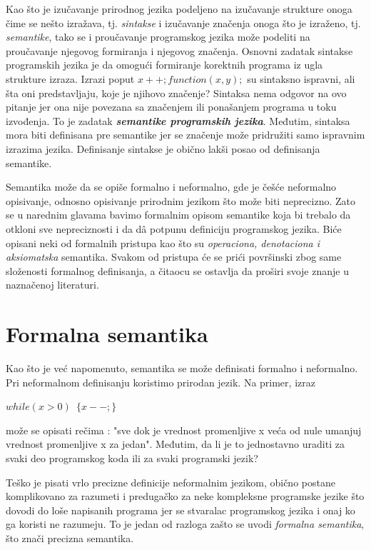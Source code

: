 \documentclass[a4paper]{article}
\begin{document}
{ Kao što je izučavanje prirodnog jezika podeljeno  na izučavanje strukture onoga čime se nešto izražava, tj. \textit{sintakse} i izučavanje značenja onoga što je izraženo, tj. \textit{semantike}, tako se i proučavanje programskog jezika može podeliti na proučavanje njegovog formiranja i njegovog značenja. Osnovni zadatak sintakse programskih jezika je da omogući formiranje korektnih programa iz ugla strukture izraza. Izrazi poput $ x++; function(x,y); $ su sintaksno ispravni, ali šta oni predstavljaju, koje je njihovo značenje? Sintaksa nema odgovor na ovo pitanje jer ona nije povezana sa značenjem ili ponašanjem programa u toku izvođenja. To je zadatak \textit{\textbf{semantike programskih jezika}}. Međutim, sintaksa mora biti definisana pre semantike jer se značenje može pridružiti samo ispravnim izrazima jezika. Definisanje sintakse je obično lakši posao od definisanja semantike.

	Semantika može da se opiše formalno i neformalno, gde je češće neformalno opisivanje, odnosno opisivanje prirodnim jezikom što može biti neprecizno. Zato se u narednim glavama bavimo formalnim opisom semantike koja bi trebalo da otkloni sve nepreciznosti i da d\^a potpunu definiciju programskog jezika. Biće opisani neki od formalnih pristupa kao što su \textit{operaciona, denotaciona i aksiomatska} semantika. Svakom od pristupa će se prići površinski zbog same složenosti formalnog definisanja, a čitaocu se ostavlja da proširi svoje znanje u naznačenoj literaturi.



\section{Formalna semantika}
\label{sec:forsem}

\qquad Kao što je već napomenuto, semantika se može definisati formalno i neformalno. Pri neformalnom definisanju koristimo prirodan jezik. Na primer, izraz
\begin{center}
\texttt{$ while(x > 0)$  $\lbrace x--;\rbrace$}
\end{center} može se opisati rečima : "sve dok je vrednost promenljive x veća od nule umanjuj vrednost promenljive x za jedan". Međutim, da li je to jednostavno uraditi za svaki deo programskog koda ili za svaki programski jezik?

Teško je pisati vrlo precizne definicije neformalnim jezikom, obično postane komplikovano za razumeti i predugačko za neke kompleksne programske jezike što dovodi do loše napisanih programa jer se stvaralac programskog jezika i onaj ko ga koristi ne razumeju. To je jedan od razloga zašto se uvodi \textit{formalna semantika}, što znači precizna semantika.

}
\end{document}
